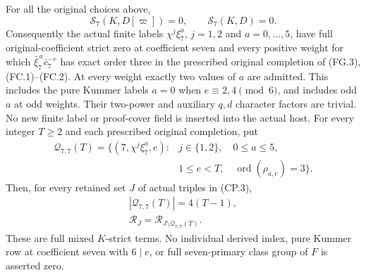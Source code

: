 \begin{theorem}
\label{AC-G213}
For all the original choices above,
\[
             \mathcal S_7(K,D[\varpi])=0,
             \qquad \mathcal S_7(K,D)=0.
 \tag{M77.3}
\]
Consequently the actual finite labels
$\chi^j\xi_7^a$, $j=1,2$ and $a=0,\ldots,5$, have full
original-coefficient strict zero at coefficient seven and
every positive weight for which
$\bar\xi_7^{\,a}\bar c_7^{-e}$ has exact order three in the
prescribed original completion of (FG.3), (FC.1)--(FC.2).
At every weight exactly two values of $a$ are admitted.
This includes the pure Kummer labels $a=0$ when
$e\equiv2,4\pmod6$, and includes odd $a$ at odd weights.
Their two-power and auxiliary $q,d$ character factors are
trivial. No new finite label or proof-cover field is inserted
into the actual host.
For every integer $T\geq2$ and each prescribed original
completion, put
\[
 \begin{split}
 \mathcal Q_{7,7}(T)=\{(7,\chi^j\xi_7^a,e):{}&j\in\{1,2\},\quad0\leq a\leq5,\\
                 &1\leq e<T,\quad\operatorname{ord}(\rho_{a,e})=3\}.
 \end{split}\tag{M77.4}
\]
Then, for every retained set $J$ of actual triples in (CP.3),
\[
 \begin{gathered}
                         |\mathcal Q_{7,7}(T)|=4(T-1),\\
                 \mathcal R_J=
                    \mathcal R_{J\setminus\mathcal Q_{7,7}(T)}.
 \end{gathered}\tag{M77.5}
\]
These are full mixed $K$-strict terms. No individual derived
index, pure Kummer row at coefficient seven with $6\mid e$,
or full seven-primary class group of $F$ is asserted zero.
\end{theorem}

